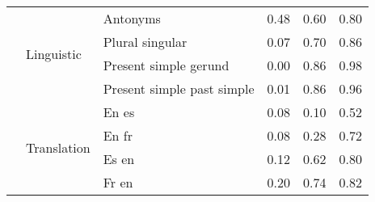 \begin{center}
\begin{longtable}{lllrrr}
\cline{2-6}
 & \multirow[t]{4}{*}{Linguistic} & Antonyms & 0.48 & 0.60 & 0.80 \\
 &  & Plural singular & 0.07 & 0.70 & 0.86 \\
 &  & Present simple gerund & 0.00 & 0.86 & 0.98 \\
 &  & Present simple past simple & 0.01 & 0.86 & 0.96 \\
\cline{2-6}
 & \multirow[t]{4}{*}{Translation} & En es & 0.08 & 0.10 & 0.52 \\
 &  & En fr & 0.08 & 0.28 & 0.72 \\
 &  & Es en & 0.12 & 0.62 & 0.80 \\
 &  & Fr en & 0.20 & 0.74 & 0.82 \\
\cline{1-6} \cline{2-6}
\bottomrule
\end{longtable}

\end{center}
\twocolumn